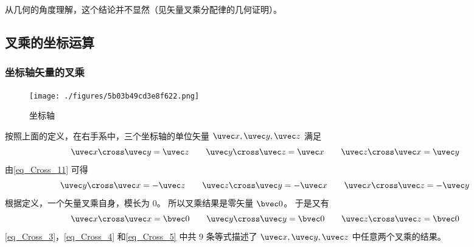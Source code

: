 从几何的角度理解，这个结论并不显然（见矢量叉乘分配律的几何证明）。

\subsection{叉乘的坐标运算}
\subsubsection{坐标轴矢量的叉乘}
\begin{figure}[ht]
\centering
\texttt{[image: ./figures/5b03b49cd3e8f622.png]}
\caption{坐标轴} \label{fig_Cross_3}
\end{figure}
按照上面的定义，在右手系中，三个坐标轴的单位矢量 $\uvec x, \uvec y, \uvec z$ 满足
\begin{equation}\label{eq_Cross_3}
\uvec x \cross \uvec y = \uvec z
\qquad
\uvec y \cross \uvec z = \uvec x
\qquad
\uvec z \cross \uvec x = \uvec y~
\end{equation}
由\autoref{eq_Cross_11} 可得
\begin{equation}\label{eq_Cross_4}
\uvec y \cross \uvec x =  - \uvec z
\qquad
\uvec z \cross \uvec y =  - \uvec x
\qquad
\uvec x \cross \uvec z =  - \uvec y~
\end{equation}
根据定义，一个矢量叉乘自身，模长为 $0$。 所以叉乘结果是零矢量 $\bvec 0$。 于是又有
\begin{equation}\label{eq_Cross_5}
\uvec x \cross \uvec x = \bvec 0
\qquad
\uvec y \cross \uvec y = \bvec 0
\qquad
\uvec z \cross \uvec z = \bvec 0~
\end{equation}
\autoref{eq_Cross_3}，\autoref{eq_Cross_4} 和\autoref{eq_Cross_5} 中共 9 条等式描述了 $\uvec x, \uvec y, \uvec z$ 中任意两个叉乘的结果。

